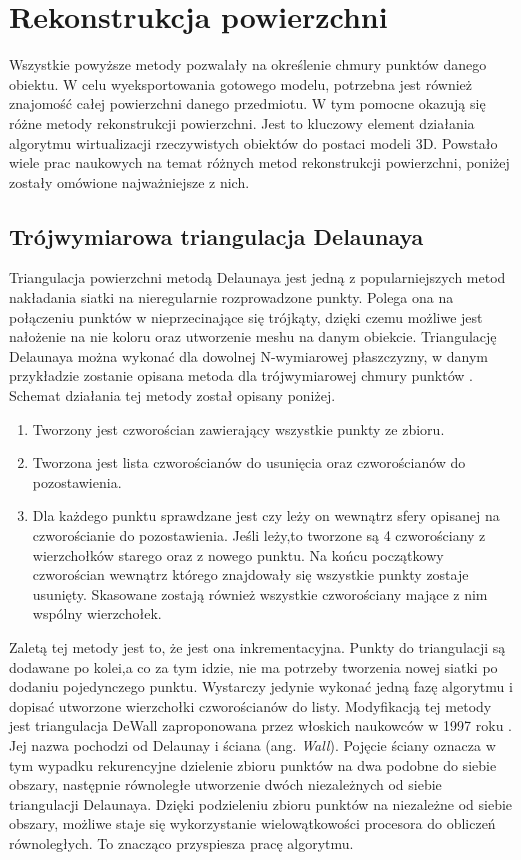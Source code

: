 \section{Rekonstrukcja powierzchni}
Wszystkie powyższe metody pozwalały na określenie chmury punktów danego obiektu. W celu wyeksportowania gotowego modelu, potrzebna jest również znajomość całej powierzchni danego przedmiotu. W tym pomocne okazują się różne metody rekonstrukcji powierzchni. Jest to kluczowy element działania algorytmu wirtualizacji rzeczywistych obiektów do postaci modeli 3D. Powstało wiele prac naukowych na temat różnych metod rekonstrukcji powierzchni, poniżej zostały omówione najważniejsze z nich.
\subsection{Trójwymiarowa triangulacja Delaunaya}
Triangulacja powierzchni metodą Delaunaya jest jedną z popularniejszych metod nakładania siatki na nieregularnie rozprowadzone punkty. Polega ona na połączeniu punktów w nieprzecinające się trójkąty, dzięki czemu możliwe jest nałożenie na nie koloru oraz utworzenie meshu na danym obiekcie. Triangulację Delaunaya można wykonać dla dowolnej N-wymiarowej płaszczyzny, w danym przykładzie zostanie opisana metoda dla trójwymiarowej chmury punktów \cite{cignoni1998dewall}. Schemat działania tej metody został opisany poniżej. 
\begin{enumerate}
    \item Tworzony jest czworościan zawierający wszystkie punkty ze zbioru.
    \item Tworzona jest lista czworościanów do usunięcia oraz czworościanów do pozostawienia.
    \item Dla każdego punktu sprawdzane jest czy leży on wewnątrz sfery opisanej na czworościanie do pozostawienia. Jeśli leży,to tworzone są 4 czworościany z wierzchołków starego oraz z nowego punktu.
    \Item Na końcu początkowy czworościan wewnątrz którego znajdowały się wszystkie punkty zostaje usunięty. Skasowane zostają również wszystkie czworościany mające z nim wspólny wierzchołek.
\end{enumerate}
Zaletą tej metody jest to, że jest ona inkrementacyjna. Punkty do triangulacji są dodawane po kolei,a co za tym idzie, nie ma potrzeby tworzenia nowej siatki po dodaniu pojedynczego punktu. Wystarczy jedynie wykonać jedną fazę algorytmu i dopisać utworzone wierzchołki czworościanów do listy.
Modyfikacją tej metody jest triangulacja DeWall zaproponowana przez włoskich naukowców w 1997 roku \cite{cignoni1998dewall}. Jej nazwa pochodzi od Delaunay i ściana (ang. \textit{Wall}). Pojęcie ściany oznacza w tym wypadku rekurencyjne dzielenie zbioru punktów na dwa podobne do siebie obszary, następnie równoległe utworzenie dwóch niezależnych od siebie triangulacji Delaunaya. Dzięki podzieleniu zbioru punktów na niezależne od siebie obszary, możliwe staje się wykorzystanie wielowątkowości procesora do obliczeń równoległych. To znacząco przyspiesza pracę algorytmu.
